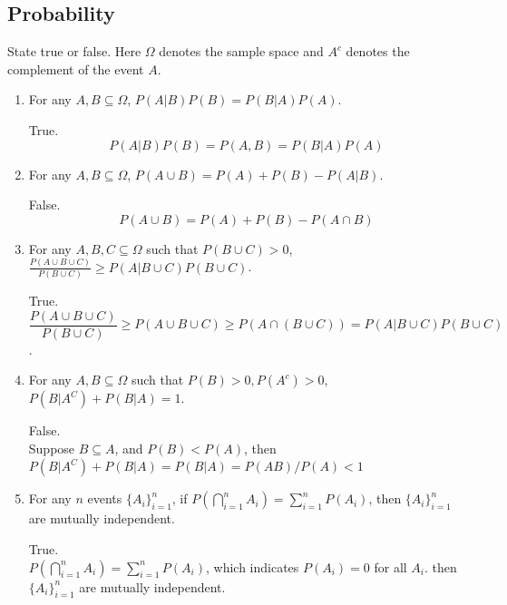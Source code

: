 \documentclass[a4paper]{article}
\theoremstyle{definition}
\newenvironment{soln}{
    \leavevmode\color{blue}\ignorespaces
}{}
\begin{document}
\subsection{Probability}
State true or false. Here $\Omega$ denotes the sample space and $A^c$ denotes the complement of the event $A$.
\begin{enumerate}
\item For any $A, B \subseteq \Omega$, $P(A|B)P(B) = P(B|A)P(A)$.\\
  \begin{soln}
  True.\\
  $$P(A|B)P(B) = P(A,B) = P(B|A)P(A)$$
  \end{soln}
\item For any $A, B \subseteq \Omega$, $P(A \cup B) = P(A) + P(B) - P(A | B)$.\\         
  \begin{soln}
  False.\\
  $$P(A \cup B) = P(A) + P(B) - P(A \cap B)$$
  \end{soln}
\item For any $A, B, C \subseteq \Omega$ such that $P(B \cup C) > 0$,
  $\frac{P(A \cup B \cup C)}{P(B \cup C)} \geq P(A | B \cup C) P(B \cup C)$.\\ 
  \begin{soln}
  True.\\
  $$\frac{P(A \cup B \cup C)}{P(B \cup C)} \geq P(A \cup B \cup C) \geq P(A \cap (B \cup C)) = P(A | B \cup C) P(B \cup C)$$.
  \end{soln}
\item For any $A, B\subseteq\Omega$ such that $P(B) > 0, P(A^c) > 0$,
  $P(B|A^C) + P(B|A) = 1$.\\ 
  \begin{soln}
  False.\\
  Suppose $B \subseteq A$, and $P(B) < P(A)$, then $P(B|A^C) + P(B|A) = P(B|A) = P(AB)/P(A) < 1$
  \end{soln}
\item For any $n$ events $\{A_i\}_{i=1}^n$, if
  $P(\bigcap_{i=1}^n A_i) = \sum_{i=1}^n P(A_i)$, then
  $\{A_i\}_{i=1}^n$ are mutually independent.\\
  \begin{soln}
  True.\\
  $P(\bigcap_{i=1}^n A_i) = \sum_{i=1}^n P(A_i)$, which indicates $P(A_i) = 0$ for all $A_i$. then $\{A_i\}_{i=1}^n$ are mutually independent.
  \end{soln}
\end{enumerate}
\end{document}
